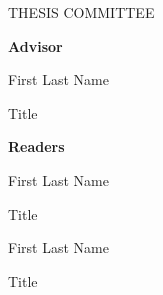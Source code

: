 \hypersetup{pageanchor=false}
\thispagestyle{empty}
\begingroup
\setlength{\parindent}{0pt}
\begin{flushright}
  \vspace*{\fill}
  {\large\MakeUppercase{Thesis Committee}\par}
  \vspace{0.75in}

  {\bfseries Advisor\par}
  \vspace{0.2in}
  First Last Name\par
  Title\par
  \vspace{0.65in}

  {\bfseries Readers\par}
  \vspace{0.2in}
  First Last Name\par
  Title\par
  \vspace{0.35in}
  First Last Name\par
  Title\par
  \vspace*{\fill}
\end{flushright}
\endgroup
\clearpage
\hypersetup{pageanchor=true}
